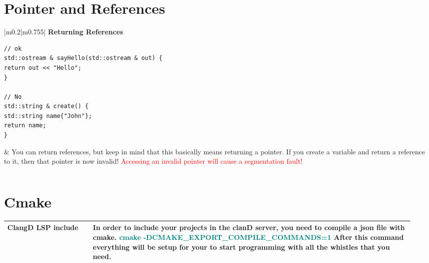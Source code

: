 \documentclass[main.tex,fontsize=8pt,paper=a4,paper=portrait,DIV=calc,]{scrartcl}
\begin{document}
\begin{table}[ht!]
\section{Pointer and References}
\begin{tabular}{|m{0.2\linewidth}|m{0.755\linewidth}|}
\hline
\textbf{Returning References}\newline
\begin{lstlisting}
// ok
std::ostream & sayHello(std::ostream & out) {
return out << "Hello";
}

// No 
std::string & create() {
std::string name{"John"};
return name;
}
\end{lstlisting}
& 
You can return references, but keep in mind that this basically means returning a pointer.\newline
If you create a variable and return a reference to it, then that pointer is now invalid!\newline
\textcolor{red}{Accessing an invalid pointer will cause a segmentation fault!}\\
\hline
\end{tabular}
\begin{tabular}{|m{0.2\linewidth}|m{0.755\linewidth}|}
\hline

\hline
\end{tabular}
\section{Cmake}
\begin{tabular}{|m{0.2\linewidth}|m{0.755\linewidth}|}
\hline
\textbf{ClangD LSP include} & 
In order to include your projects in the clanD server, you need to compile a json file with cmake.\newline
\large\textbf{\textcolor{teal}{cmake -DCMAKE\_EXPORT\_COMPILE\_COMMANDS=1}}\newline
\normalsize After this command everything will be setup for your to start programming with all the whistles that you need.\\
\hline
\end{tabular}

\end{table}
\end{document}
